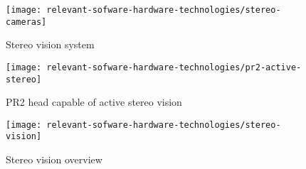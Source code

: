 \begin{figure}[H]
	\centering
	\texttt{[image: relevant-sofware-hardware-technologies/stereo-cameras]}
	\caption[Stereo vision system]{Stereo vision system \cite{Kaczurba2013}}
	\label{fig:relevant-sofware-hardware-technologies_stereo-cameras}
\end{figure}


\begin{figure}[H]
	\centering
	\texttt{[image: relevant-sofware-hardware-technologies/pr2-active-stereo]}
	\caption[PR2 head capable of active stereo vision]{PR2 head capable of active stereo vision\protect\footnotemark}
	\label{fig:relevant-sofware-hardware-technologies_pr2-active-stereo}
\end{figure}


\begin{figure}[hb]
	\centering
	\texttt{[image: relevant-sofware-hardware-technologies/stereo-vision]}
	\caption[Stereo vision overview]{Stereo vision overview \cite{Yang2014}}
	\label{fig:relevant-sofware-hardware-technologies_stereo-vision}
\end{figure}

\clearpage
